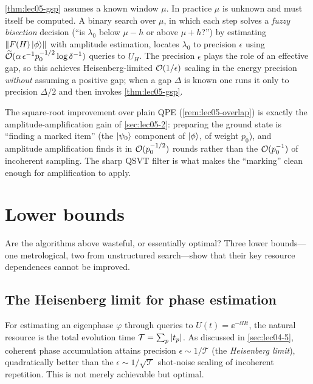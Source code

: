 \begin{remark}
\label{rem:lec05-bisection}
\cref{thm:lec05-gsp} assumes a known window $\mu$. In practice $\mu$ is unknown and
must itself be computed. A binary search over $\mu$, in which each step solves a
\emph{fuzzy bisection} decision (``is $\lambda_0$ below $\mu-h$ or above
$\mu+h$?'') by estimating $\left\lVert F(H)\ket{\phi} \right\rVert$ with amplitude estimation,
locates $\lambda_0$ to precision $\epsilon$ using
$\widetilde{\mathcal{O}}(\alpha\,\epsilon^{-1}p_0^{-1/2}\log\delta^{-1})$ queries to
$U_H$. The precision $\epsilon$ plays the role of an effective gap, so this
achieves Heisenberg-limited $\mathcal{O}(1/\epsilon)$ scaling in the energy precision
\emph{without} assuming a positive gap; when a gap $\Delta$ is known one runs it
only to precision $\Delta/2$ and then invokes \cref{thm:lec05-gsp}.
\end{remark}

\begin{remark}
\label{rem:lec05-sqrt}
The square-root improvement over plain QPE (\cref{rem:lec05-overlap}) is exactly
the amplitude-amplification gain of \cref{sec:lec05-2}: preparing the ground state
is ``finding a marked item'' (the $\ket{\psi_0}$ component of $\ket{\phi}$, of
weight $p_0$), and amplitude amplification finds it in $\mathcal{O}(p_0^{-1/2})$ rounds
rather than the $\mathcal{O}(p_0^{-1})$ of incoherent sampling. The sharp QSVT filter is
what makes the ``marking'' clean enough for amplification to apply.
\end{remark}

\section{Lower bounds}
\label{sec:lec05-4}

Are the algorithms above wasteful, or essentially optimal? Three lower bounds---one
metrological, two from unstructured search---show that their key resource
dependences cannot be improved.

\subsection*{The Heisenberg limit for phase estimation}

For estimating an eigenphase $\varphi$ through queries to $U(t)=\ee^{-\ii Ht}$, the
natural resource is the total evolution time
$\mathcal T=\sum_p\left\lvert t_p \right\rvert$. As discussed in \cref{sec:lec04-5}, coherent phase
accumulation attains precision $\epsilon\sim1/\mathcal T$ (the \emph{Heisenberg
limit}), quadratically better than the $\epsilon\sim1/\sqrt{\mathcal T}$
shot-noise scaling of incoherent repetition. This is not merely achievable but
optimal.

